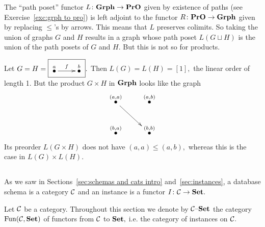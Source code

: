 \documentclass[CT4S-EN-RU]{subfiles}
\begin{document}
\begin{exampleRUS}
\end{exampleRUS}

\begin{exampleENG}
The “path poset” functor $L\colon{\mathbf{Grph}}\rightarrow{\mathbf{PrO}}$ given by existence of paths (see Exercise~\ref{exc:grph to pro}) is left adjoint to the functor $R\colon{\mathbf{PrO}}\rightarrow{\mathbf{Grph}}$ given by replacing $\leq$'s by arrows. This means that $L$ preserves colimits. So taking the union of graphs $G$ and $H$ results in a graph whose path poset  $L(G\sqcup H)$ is the union of the path posets of $G$ and $H.$ But this is not so for products. 

Let $G=H=\fbox{\xymatrix{\LMO{a}\ar[r]^f&\LMO{b}}}.$ Then $L(G)=L(H)=[1],$ the linear order of length 1. But the product $G\times H$ in ${\mathbf{Grph}}$ looks like the graph 
$$\xymatrix{\LMO{(a,a)}\ar[rd]&\LMO{(a,b)}\\\LMO{(b,a)}&\LMO{(b,b)}}$$
Its preorder $L(G\times H)$ does not have $(a,a)\leq(a,b),$ whereas this is the case in $L(G)\times L(H).$
\end{exampleENG}

\begin{exampleRUS}
\end{exampleRUS}


\subsection{}\label{sec:data migration}

\begin{blockENG}
As we saw in Sections~\ref{sec:schemas and cats intro} and~\ref{sec:instances}, a database schema is a category $\mathcal{C}$ and an instance is a functor $I\colon\mathcal{C}\rightarrow{\mathbf{Set}}.$  
\end{blockENG}

\begin{blockRUS}
\end{blockRUS}

\begin{notationENG}
Let $\mathcal{C}$ be a category. Throughout this section we denote by $\mathcal{C}{\text \textendash}{\mathbf{Set}}$ the category $\operatorname{Fun}(\mathcal{C},{\mathbf{Set}})$ of functors from $\mathcal{C}$ to ${\mathbf{Set}},$ i.e. the category of instances on $\mathcal{C}.$ 
\end{notationENG}

\begin{notationRUS}
\end{notationRUS}
\end{document}
